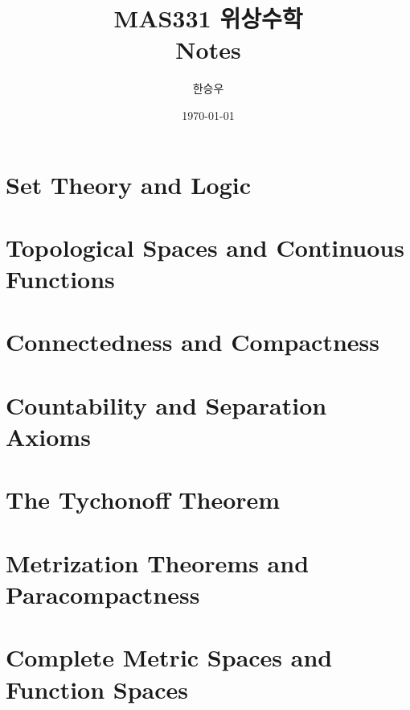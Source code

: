 \documentclass[a4paper,12pt]{report}
\title{\Huge{MAS331 위상수학}\\Notes}
\author{\huge{한승우}}
\date{\today}
\begin{document}
\maketitle
\newpage
{}
\tableofcontents
\pagebreak

\chapter{Set Theory and Logic}
 

\chapter{Topological Spaces and Continuous Functions}


\chapter{Connectedness and Compactness}


\chapter{Countability and Separation Axioms}


\chapter{The Tychonoff Theorem}


\chapter{Metrization Theorems and Paracompactness}

\chapter{Complete Metric Spaces and Function Spaces}

\end{document}
